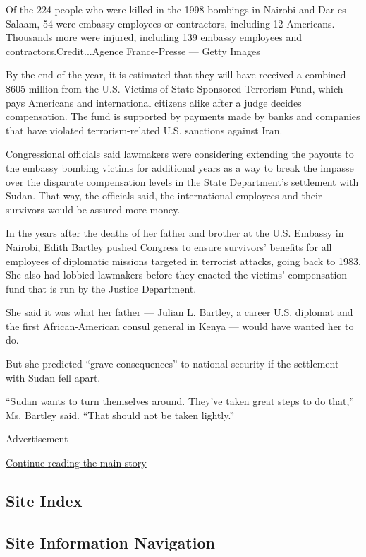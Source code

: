 Of the 224 people who were killed in the 1998 bombings in Nairobi and
Dar-es-Salaam, 54 were embassy employees or contractors, including 12
Americans. Thousands more were injured, including 139 embassy employees
and contractors.Credit...Agence France-Presse --- Getty Images

By the end of the year, it is estimated that they will have received a
combined \$605 million from the U.S. Victims of State Sponsored
Terrorism Fund, which pays Americans and international citizens alike
after a judge decides compensation. The fund is supported by payments
made by banks and companies that have violated terrorism-related U.S.
sanctions against Iran.

Congressional officials said lawmakers were considering extending the
payouts to the embassy bombing victims for additional years as a way to
break the impasse over the disparate compensation levels in the State
Department's settlement with Sudan. That way, the officials said, the
international employees and their survivors would be assured more money.

In the years after the deaths of her father and brother at the U.S.
Embassy in Nairobi, Edith Bartley pushed Congress to ensure survivors'
benefits for all employees of diplomatic missions targeted in terrorist
attacks, going back to 1983. She also had lobbied lawmakers before they
enacted the victims' compensation fund that is run by the Justice
Department.

She said it was what her father --- Julian L. Bartley, a career U.S.
diplomat and the first African-American consul general in Kenya ---
would have wanted her to do.

But she predicted ``grave consequences'' to national security if the
settlement with Sudan fell apart.

``Sudan wants to turn themselves around. They've taken great steps to do
that,'' Ms. Bartley said. ``That should not be taken lightly.''

Advertisement

\protect\hyperlink{after-bottom}{Continue reading the main story}

\hypertarget{site-index}{%
\subsection{Site Index}\label{site-index}}

\hypertarget{site-information-navigation}{%
\subsection{Site Information
Navigation}\label{site-information-navigation}}

